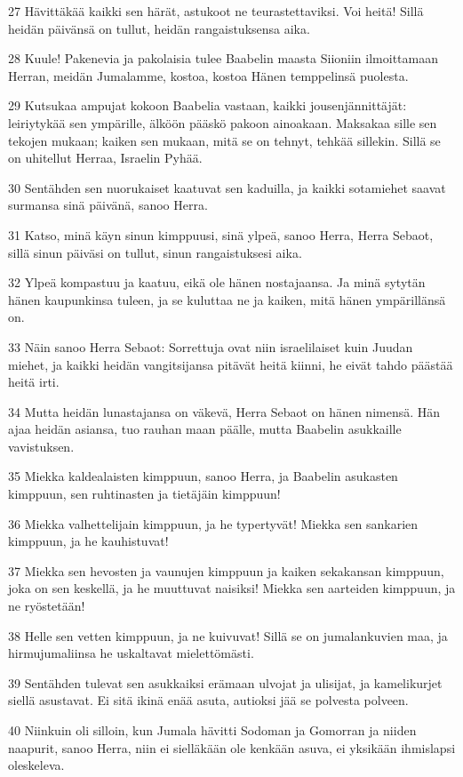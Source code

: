\par 27 Hävittäkää kaikki sen härät, astukoot ne teurastettaviksi. Voi heitä! Sillä heidän päivänsä on tullut, heidän rangaistuksensa aika.
\par 28 Kuule! Pakenevia ja pakolaisia tulee Baabelin maasta Siioniin ilmoittamaan Herran, meidän Jumalamme, kostoa, kostoa Hänen temppelinsä puolesta.
\par 29 Kutsukaa ampujat kokoon Baabelia vastaan, kaikki jousenjännittäjät: leiriytykää sen ympärille, älköön pääskö pakoon ainoakaan. Maksakaa sille sen tekojen mukaan; kaiken sen mukaan, mitä se on tehnyt, tehkää sillekin. Sillä se on uhitellut Herraa, Israelin Pyhää.
\par 30 Sentähden sen nuorukaiset kaatuvat sen kaduilla, ja kaikki sotamiehet saavat surmansa sinä päivänä, sanoo Herra.
\par 31 Katso, minä käyn sinun kimppuusi, sinä ylpeä, sanoo Herra, Herra Sebaot, sillä sinun päiväsi on tullut, sinun rangaistuksesi aika.
\par 32 Ylpeä kompastuu ja kaatuu, eikä ole hänen nostajaansa. Ja minä sytytän hänen kaupunkinsa tuleen, ja se kuluttaa ne ja kaiken, mitä hänen ympärillänsä on.
\par 33 Näin sanoo Herra Sebaot: Sorrettuja ovat niin israelilaiset kuin Juudan miehet, ja kaikki heidän vangitsijansa pitävät heitä kiinni, he eivät tahdo päästää heitä irti.
\par 34 Mutta heidän lunastajansa on väkevä, Herra Sebaot on hänen nimensä. Hän ajaa heidän asiansa, tuo rauhan maan päälle, mutta Baabelin asukkaille vavistuksen.
\par 35 Miekka kaldealaisten kimppuun, sanoo Herra, ja Baabelin asukasten kimppuun, sen ruhtinasten ja tietäjäin kimppuun!
\par 36 Miekka valhettelijain kimppuun, ja he typertyvät! Miekka sen sankarien kimppuun, ja he kauhistuvat!
\par 37 Miekka sen hevosten ja vaunujen kimppuun ja kaiken sekakansan kimppuun, joka on sen keskellä, ja he muuttuvat naisiksi! Miekka sen aarteiden kimppuun, ja ne ryöstetään!
\par 38 Helle sen vetten kimppuun, ja ne kuivuvat! Sillä se on jumalankuvien maa, ja hirmujumaliinsa he uskaltavat mielettömästi.
\par 39 Sentähden tulevat sen asukkaiksi erämaan ulvojat ja ulisijat, ja kamelikurjet siellä asustavat. Ei sitä ikinä enää asuta, autioksi jää se polvesta polveen.
\par 40 Niinkuin oli silloin, kun Jumala hävitti Sodoman ja Gomorran ja niiden naapurit, sanoo Herra, niin ei sielläkään ole kenkään asuva, ei yksikään ihmislapsi oleskeleva.
